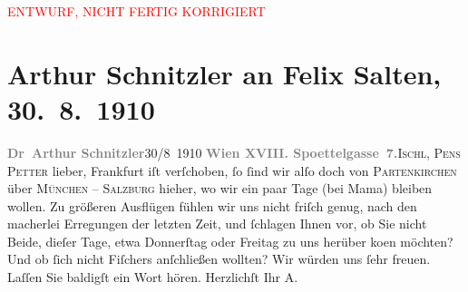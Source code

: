 
\begin{center}
            \textcolor{red}{ENTWURF, NICHT FERTIG KORRIGIERT}
                      \end{center}
            
         
         \renewcommand{\erwaehntePersonen}{Personen: Samuel Fischer, Hedwig Fischer, Felix Salten, Ottilie Salten, Louise Schnitzler}
         \renewcommand{\erwaehnteOrte}{Orte: Bad Ischl, Edmund-Weiß-Gasse, Frankfurt am Main, Hotel und Pension Rudolfshöhe (Leopold Petter), München, Partenkirchen, Salzburg, Unterach am Attersee}
         \renewcommand{\erwaehnteWerke}{}
               \section[Arthur Schnitzler an Felix Salten, 30. 8. 1910]{ Arthur Schnitzler an Felix Salten, 30. 8. 1910}\nopagebreak{}\rehead{ }\begin{ledgroupsized}[t]{13cm}\normalsize\beginnumbering \toendnotes[C]{\smallbreak\pagebreak[2]} 
\toendnotes[C]{\smallbreak}\pstart
           \noindent{}{\pb}\textcolor{gray}{\textbf{Dr Arthur Schnitzler}}\hfill 30/8 1910\pend
           \pstart
           \textcolor{gray}{\textbf{Wien XVIII. Spoettelgasse 7.}}\hfill \textsc{Ischl, Pens Petter}\pend
           \pstart
           lieber, Frankfurt iſt verſchoben, ſo ſind wir alſo doch
               von \textsc{Partenkirchen} über \textsc{München} – \textsc{Salzburg} hieher, wo wir ein paar Tage (bei Mama) bleiben wollen. Zu größeren Ausflügen fühlen wir uns
               nicht friſch genug, nach den macherlei Erregungen der letzten Zeit, und ſchlagen
               Ihnen vor, {\pb}ob Sie nicht Beide, dieſer Tage, etwa Donnerſtag oder
               Freitag zu uns herüber ko{\geminationm}en möchten? Und ob ſich nicht
                  Fiſchers anſchließen wollten? Wir
               würden uns ſehr freuen. Laſſen Sie baldigſt ein Wort hören. \pend
           \pstart Herzlichſt Ihr \spacefill\mbox{A.}\pend{}
         

\end{ledgroupsized}
